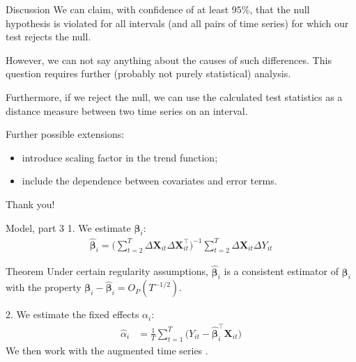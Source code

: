 \documentclass[10pt, handout]{beamer}
\newcommand{\X}{\boldsymbol{X}}
\newcommand{\bfbeta}{\boldsymbol{\beta}}
\begin{document}
\begin{frame}{Discussion}
We can claim, with confidence of at least $95\%$, that the null hypothesis is violated for all intervals (and all pairs of time series) for which our test rejects the null.

However, we can not say anything about the causes of such differences. This question requires further (probably not purely statistical) analysis.

Furthermore, if we reject the null, we can use the calculated test statistics as a distance measure between two time series on an interval.

Further possible extensions:
\vspace{-1mm}
\begin{itemize}
	\item introduce scaling factor in the trend function;
	\item include the dependence between covariates and error terms.
\end{itemize}
\end{frame}

\begin{frame}[standout]
  Thank you!
\end{frame}


\appendix


\begin{frame}{Model, part 3}
1. We estimate $\bfbeta_i$:
\begin{align*}
\widehat{\bfbeta}_i = \Big( \sum_{t=2}^T \Delta \X_{it} \Delta \X_{it}^\top \Big)^{-1} \sum_{t=2}^T \Delta \X_{it} \Delta Y_{it}
\end{align*}
\vspace{-3mm}
\begin{block}{Theorem}
Under certain regularity assumptions, $\widehat{\bfbeta}_i$ is a consistent estimator of $\bfbeta_i$ with the property $\bfbeta_i - \widehat{\bfbeta}_i = O_P(T^{-1/2})$.
\end{block}
2. We estimate the fixed effects $\alpha_i$:
\begin{align*}
\widehat{\alpha}_i &= \frac{1}{T}\sum_{t=1}^T \big(Y_{it} - \widehat{\bfbeta}_i^\top \X_{it}\big)
\end{align*}
We then work with the augmented time series \color{mLightBrown}{$\widehat{Y}_{it} = Y_{it} - \widehat{\alpha}_i - \widehat{\bfbeta}_i^\top \X_{it}$}.
\end{frame}
\end{document}
